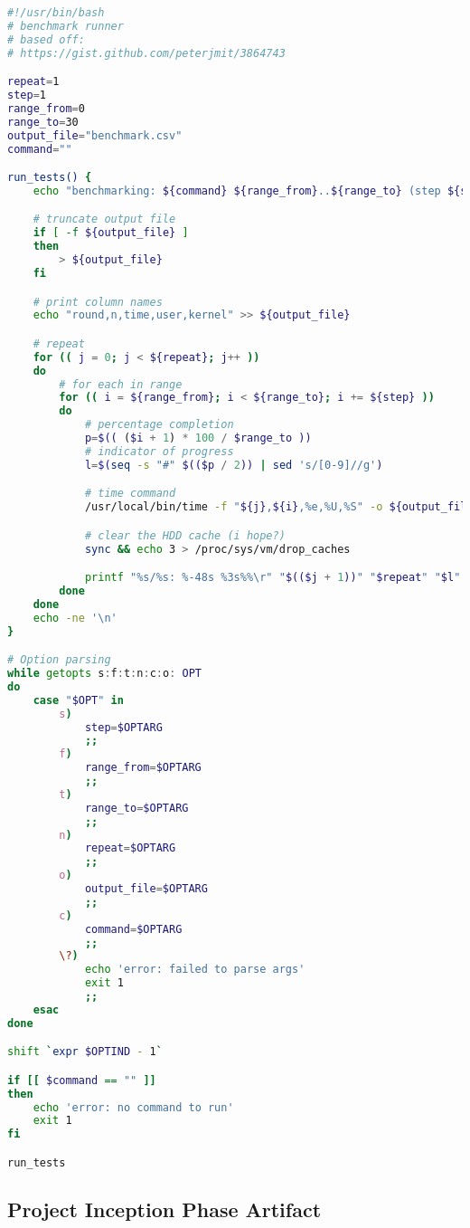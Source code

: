 \begin{lstlisting}[language=bash]
#!/usr/bin/bash
# benchmark runner
# based off:
# https://gist.github.com/peterjmit/3864743

repeat=1
step=1
range_from=0
range_to=30
output_file="benchmark.csv"
command=""

run_tests() {
    echo "benchmarking: ${command} ${range_from}..${range_to} (step ${step})"

    # truncate output file
    if [ -f ${output_file} ]
    then
        > ${output_file}
    fi

    # print column names
    echo "round,n,time,user,kernel" >> ${output_file}

    # repeat
    for (( j = 0; j < ${repeat}; j++ ))
    do
        # for each in range
        for (( i = ${range_from}; i < ${range_to}; i += ${step} ))
        do
            # percentage completion
            p=$(( ($i + 1) * 100 / $range_to ))
            # indicator of progress
            l=$(seq -s "#" $(($p / 2)) | sed 's/[0-9]//g')

            # time command
            /usr/local/bin/time -f "${j},${i},%e,%U,%S" -o ${output_file} -a ${command} ${i} > /dev/null

            # clear the HDD cache (i hope?)
            sync && echo 3 > /proc/sys/vm/drop_caches

            printf "%s/%s: %-48s %3s%%\r" "$(($j + 1))" "$repeat" "$l" "$p"
        done
    done
    echo -ne '\n'
}

# Option parsing
while getopts s:f:t:n:c:o: OPT
do
    case "$OPT" in
        s)
            step=$OPTARG
            ;;
        f)
            range_from=$OPTARG
            ;;
        t)
            range_to=$OPTARG
            ;;
        n)
            repeat=$OPTARG
            ;;
        o)
            output_file=$OPTARG
            ;;
        c)
            command=$OPTARG
            ;;
        \?)
            echo 'error: failed to parse args'
            exit 1
            ;;
    esac
done

shift `expr $OPTIND - 1`

if [[ $command == "" ]]
then
    echo 'error: no command to run'
    exit 1
fi

run_tests
\end{lstlisting}

\subsection{Project Inception Phase Artifact}
\label{appendix:inception-artifact}



